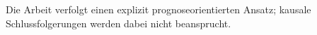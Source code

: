 \documentclass[12pt,a4paper]{article}
\begin{document}

Die Arbeit verfolgt einen explizit prognoseorientierten Ansatz; kausale Schlussfolgerungen werden
dabei nicht beansprucht.


%
%
%
%
%
%
\end{document}
